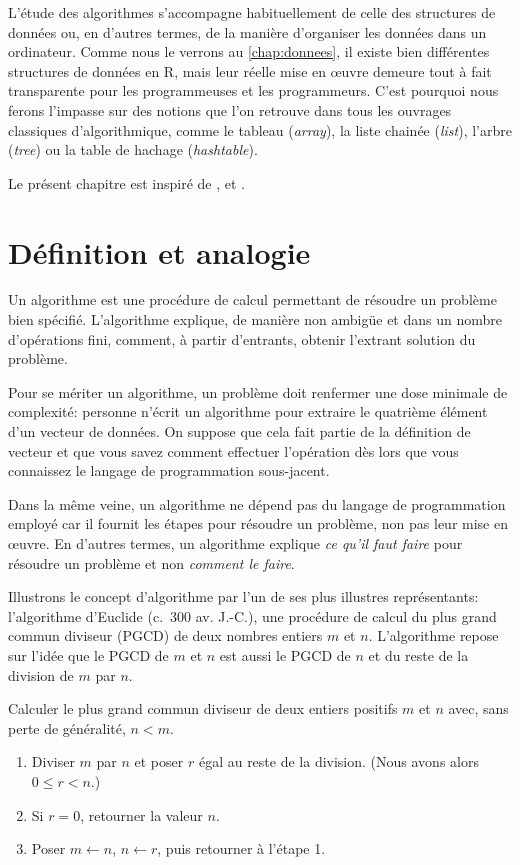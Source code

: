 L'étude des algorithmes s'accompagne habituellement de celle des
structures de données ou, en d'autres termes, de la manière
d'organiser les données dans un ordinateur. Comme nous le verrons au
\autoref{chap:donnees}, il existe bien différentes structures de
données en R, mais leur réelle mise en œuvre demeure tout à fait
transparente pour les programmeuses et les programmeurs. C'est
pourquoi nous ferons l'impasse sur des notions que l'on retrouve dans
tous les ouvrages classiques d'algorithmique, comme le tableau
(\emph{array}), la liste chainée (\emph{list}), l'arbre (\emph{tree})
ou la table de hachage (\emph{hashtable}).

Le présent chapitre est inspiré de \citet{Sussman:scheme:1996},
\citet{Knuth:ACP:vol1:1997} et \citet{Stephens:algorithms:2013}.


\section{Définition et analogie}
\label{sec:algorithmes:definition}

Un algorithme est une procédure de calcul
permettant de résoudre un problème bien spécifié. L'algorithme
explique, de manière non ambigüe et dans un nombre d'opérations fini,
comment, à partir d'entrants, obtenir l'extrant solution du problème.

Pour se mériter un algorithme, un problème doit renfermer une dose
minimale de complexité: personne n'écrit un algorithme pour extraire
le quatrième élément d'un vecteur de données. On suppose que cela fait
partie de la définition de vecteur et que vous savez comment effectuer
l'opération dès lors que vous connaissez le langage de programmation
sous-jacent.

Dans la même veine, un algorithme ne dépend pas du langage de
programmation employé car il fournit les étapes pour résoudre un
problème, non pas leur mise en œuvre. En d'autres termes, un
algorithme explique \emph{ce qu'il faut faire} pour résoudre un
problème et non \emph{comment le faire}.

Illustrons le concept d'algorithme par l'un de ses plus illustres
représentants: l'algorithme
d'Euclide (c.~300 av. J.-C.), une procédure de calcul du plus grand
commun diviseur (PGCD) de deux nombres entiers $m$ et $n$.
L'algorithme repose sur l'idée que le PGCD de $m$ et $n$ est aussi le
PGCD de $n$ et du reste de la division de $m$ par $n$.

\begin{algorithme}
  \label{algo:algorithmes:euclide}
  Calculer le plus grand commun diviseur de deux entiers positifs $m$
  et $n$ avec, sans perte de généralité, $n < m$.
  \begin{enumerate}
  \item Diviser $m$ par $n$ et poser $r$ égal au reste de la division.
    (Nous avons alors $0 \leq r < n$.)
  \item Si $r = 0$, retourner la valeur $n$.
  \item Poser $m \leftarrow n$, $n \leftarrow r$, puis retourner à
    l'étape 1.
  \end{enumerate}
\end{algorithme}

